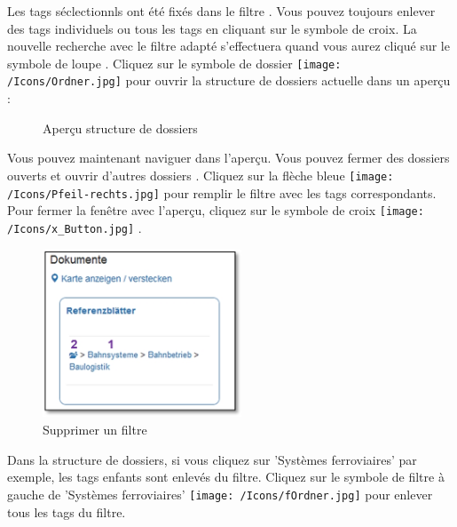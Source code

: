 Les tags séclectionnls ont été fixés dans le filtre . Vous pouvez toujours enlever des tags individuels ou tous les tags en cliquant sur le symbole de croix. La nouvelle recherche avec le filtre adapté s'effectuera quand vous aurez cliqué sur le symbole de loupe . Cliquez sur le symbole de dossier \texttt{[image: /Icons/Ordner.jpg]}  pour ouvrir la structure de dossiers actuelle dans un aperçu : 

\begin{figure}[H]
\caption{Aperçu structure de dossiers}
\end{figure}

Vous pouvez maintenant naviguer dans l'aperçu. Vous pouvez fermer des dossiers ouverts  et ouvrir d'autres dossiers . Cliquez sur la flèche bleue \texttt{[image: /Icons/Pfeil-rechts.jpg]}  pour remplir le filtre avec les tags correspondants. Pour fermer la fenêtre avec l'aperçu, cliquez sur le symbole de croix \texttt{[image: /Icons/x\_Button.jpg]} .


\pagebreak

\begin{figure}   %
  \vspace{-30pt}      %
  \begin{center}
    \includegraphics[height=50mm]{../chapters/11_Dokumentenablage/pictures/11-htag_FilterLoeschen.jpg}
  \end{center}
  \vspace{-20pt}
  \caption{Supprimer un filtre}
  \vspace{-10pt}
\end{figure}
Dans la structure de dossiers, si vous cliquez sur 'Systèmes ferroviaires'  par exemple, les tags enfants sont enlevés du filtre. Cliquez sur le symbole de filtre à gauche de 'Systèmes ferroviaires' \texttt{[image: /Icons/fOrdner.jpg]}  pour enlever tous les tags du filtre.

